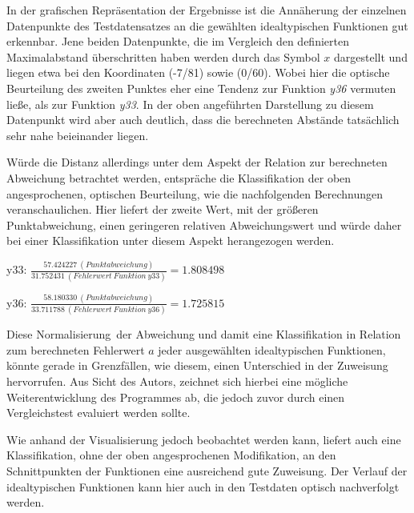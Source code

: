 In der grafischen Repräsentation der Ergebnisse ist die Annäherung der einzelnen Datenpunkte des Testdatensatzes an die gewählten idealtypischen Funktionen gut erkennbar. Jene beiden Datenpunkte, die im Vergleich den definierten Maximalabstand überschritten haben werden durch das Symbol $x$ dargestellt und liegen etwa bei den Koordinaten (-7/81) sowie (0/60). Wobei hier die optische Beurteilung des zweiten Punktes eher eine Tendenz zur Funktion \emph{y36} vermuten ließe, als zur Funktion \emph{y33}. In der oben angeführten Darstellung zu diesem Datenpunkt wird aber auch deutlich, dass die berechneten Abstände tatsächlich sehr nahe beieinander liegen.

Würde die Distanz allerdings unter dem Aspekt der Relation zur berechneten Abweichung betrachtet werden, entspräche die Klassifikation der oben angesprochenen, optischen Beurteilung, wie die nachfolgenden Berechnungen veranschaulichen. Hier liefert der zweite Wert, mit der größeren Punktabweichung, einen geringeren relativen Abweichungswert und würde daher bei einer Klassifikation unter diesem Aspekt herangezogen werden. 

\begin{center}
y33: $ \frac{57.424227\ (Punktabweichung)}{31.752431\ (Fehlerwert\ Funktion\ y33)} = 1.808498 $ 
\end{center}

\begin{center}
y36: $ \frac{58.180330\ (Punktabweichung)}{33.711788\ (Fehlerwert\ Funktion\ y36)} = 1.725815 $
\end{center}

Diese \glqq Normalisierung\grqq\ der Abweichung und damit eine Klassifikation in Relation zum berechneten Fehlerwert $a$ jeder ausgewählten idealtypischen Funktionen, könnte gerade in Grenzfällen, wie diesem, einen Unterschied in der Zuweisung hervorrufen. Aus Sicht des Autors, zeichnet sich hierbei eine mögliche Weiterentwicklung des Programmes ab, die jedoch zuvor durch einen Vergleichstest evaluiert werden sollte.

Wie anhand der Visualisierung jedoch beobachtet werden kann, liefert auch eine Klassifikation, ohne der oben angesprochenen Modifikation, an den Schnittpunkten der Funktionen eine ausreichend gute Zuweisung. Der Verlauf der idealtypischen Funktionen kann hier auch in den Testdaten optisch nachverfolgt werden.

